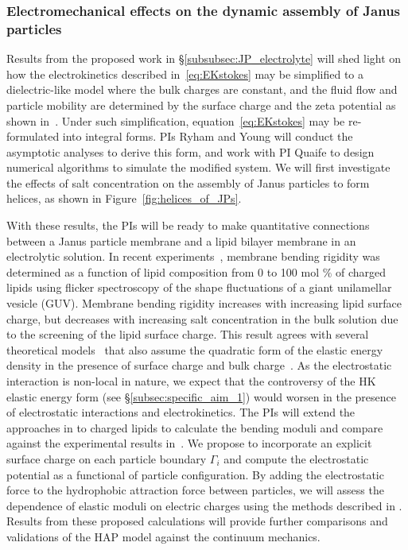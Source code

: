 \subsubsection{Electromechanical effects on the dynamic assembly of Janus particles \label{subsubsec:em_effects}}
Results from the proposed work in \S\ref{subsubsec:JP_electrolyte} will
shed light on how the electrokinetics described in~\eqref{eq:EKstokes}
may be simplified to a dielectric-like model where the bulk charges are
constant, and the fluid flow and particle mobility are determined by the
surface charge and the zeta potential as shown in~\cite{Mori2018_JFM}.
Under such simplification, equation~\eqref{eq:EKstokes} may be
re-formulated into integral forms. PIs Ryham and Young will conduct the
asymptotic analyses to derive this form, and work with PI Quaife to
design numerical algorithms to simulate the modified system. We will
first investigate the effects of salt concentration on the assembly of
Janus particles to form helices, as shown in
Figure~\ref{fig:helices_of_JPs}.

With these results, the PIs will be ready to make quantitative
connections between a Janus particle membrane and a lipid bilayer
membrane in an electrolytic solution. In recent
experiments~\cite{FaizEtAl2019_SoftMatt}, membrane bending rigidity was
determined as a function of lipid composition from 0 to 100 mol $\%$ of
charged lipids using flicker spectroscopy of the shape fluctuations of a
giant unilamellar vesicle (GUV). Membrane bending rigidity increases
with increasing lipid surface charge, but decreases with increasing salt
concentration in the bulk solution due to the screening of the lipid
surface charge. This result agrees with several theoretical
models~\cite{Kralchevsky1996_JCIS, May1996_JChemPhys,
LoubetEtAl2013_PRE} that also assume the quadratic form of the elastic
energy density in the presence of surface charge and bulk
charge~\cite{DuplantierGoldstein1990_PRL, Winterhalter1992_JPC}. As the
electrostatic interaction is non-local in nature, we expect that the
controversy of the HK elastic energy form (see
\S\ref{subsec:specific_aim_1}) would worsen in the presence of
electrostatic interactions and electrokinetics. The PIs will extend the
approaches in \cite{Fu2018_SIAM} to charged lipids to
calculate the bending moduli and compare against the experimental
results in~\cite{FaizEtAl2019_SoftMatt}. We propose to incorporate an
explicit surface charge on each particle boundary $\Gamma_i$ and compute the
electrostatic potential as a functional of particle configuration.  By
adding the electrostatic force to the hydrophobic attraction force
between particles, we will assess the dependence of elastic moduli on
electric charges using the methods described in \cite{Fu2018_SIAM}. Results from these proposed calculations
will provide further comparisons and validations of the HAP model
against the continuum mechanics.

